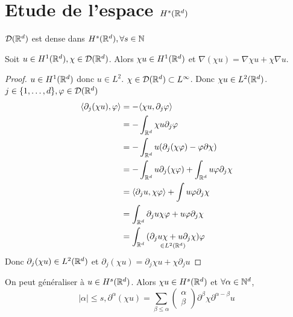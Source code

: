 \documentclass[]{report}
\begin{document}
    \section{Etude de l'espace $H^s(\mathbb{R}^d)$}

    \begin{tm}{}{}
        $\mathcal{D}(\mathbb{R}^d)$ est dense dans $H^s(\mathbb{R}^d),\forall s\in \mathbb{N}$
    \end{tm}

    \begin{lm}{}{}
        Soit $u\in H^1(\mathbb{R}^d),\chi\in\mathcal{D}(\mathbb{R}^d)$. Alors $\chi u\in H^1(\mathbb{R}^d)$ et $\nabla(\chi u)=\nabla\chi u+\chi \nabla u$.
    \end{lm}

    \begin{proof}
        $u\in H^1(\mathbb{R}^d)$ donc $u\in L^2$. $\chi\in \mathcal{D}(\mathbb{R}^d)\subset L^\infty$. Donc $\chi u \in L^2(\mathbb{R}^d)$. $j\in \{1,\ldots,d\},\varphi\in \mathcal{D}(\mathbb{R}^d)$
        \begin{align*}
            \langle \partial_j(\chi u),\varphi \rangle&=-\langle \chi u,\partial_j \varphi \rangle\\
            &=-\int_{\mathbb{R}^d}\chi u \partial_j \varphi\\
            &=-\int_{\mathbb{R}^d} u(\partial_j (\chi\varphi)-\varphi\partial \chi)\\
            &=-\int_{\mathbb{R}^d} u\partial_j(\chi \varphi)+\int_{\mathbb{R}^d}u\varphi\partial_j \chi\\
            &=\langle \partial_j u,\chi \varphi \rangle+\int u\varphi\partial_j \chi\\
            &=\int_{\mathbb{R}^d}\partial_j u\chi \varphi+u\varphi \partial_j \chi\\
            &=\int_{\mathbb{R}^d} \underset{\in L^2(\mathbb{R}^d)}{(\partial_j u \chi+ u\partial_j \chi)}\varphi
        \end{align*}
        Donc $\partial_j(\chi u)\in L^2(\mathbb{R}^d)$ et $\partial_j (\chi u)=\partial_j \chi u+\chi \partial_j u$
    \end{proof}

    \begin{re}{}{}
        On peut généraliser à $u\in H^s(\mathbb{R}^d)$. Alors $\chi u\in H^s(\mathbb{R}^d)$ et $\forall \alpha\in \mathbb{N}^d$,
        \[|\alpha|\le s,\partial^\alpha (\chi u)=\sum_{\beta\le \alpha}\left(\begin{matrix}
            \alpha\\
            \beta
        \end{matrix}\right)\partial^{\beta}\chi \partial^{\alpha-\beta} u\]
    \end{re}
\end{document}
